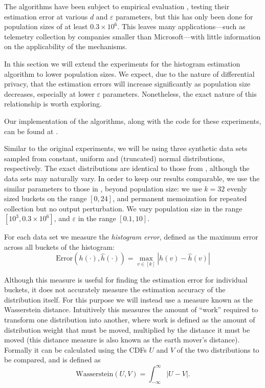 \documentclass[12pt]{article}
\renewcommand{\epsilon}{\varepsilon}
\begin{document}
The algorithms have been subject to empirical evaluation \cite[sec.~5]{microsoft_telemetry}, testing their estimation error at various $d$ and $\epsilon$ parameters, but this has only been done for population sizes of at least $0.3\times 10^6$. This leaves many applications---such as telemetry collection by companies smaller than Microsoft---with little information on the applicability of the mechanisms.

In this section we will extend the experiments for the histogram estimation algorithm to lower population sizes. We expect, due to the nature of differential privacy, that the estimation errors will increase significantly as population size decreases, especially at lower $\epsilon$ parameters. Nonetheless, the exact nature of this relationship is worth exploring. \bigskip

Our implementation of the algorithms, along with the code for these experiments, can be found at \cite{git_repo}.

Similar to the original experiments, we will be using three synthetic data sets sampled from constant, uniform and (truncated) normal distributions, respectively. The exact distributions are identical to those from \cite{microsoft_telemetry}, although the data sets may naturally vary. In order to keep our results comparable, we use the similar parameters to those in \cite{microsoft_telemetry}, beyond population size: we use $k=32$ evenly sized buckets on the range $[0,24]$, and permanent memoization for repeated collection but no output perturbation. We vary population size in the range $[10^3, 0.3 \times 10^6]$, and $\epsilon$ in the range $[0.1, 10]$.

For each data set we measure the \emph{histogram error}, defined as the maximum error across all buckets of the histogram:
\begin{equation*}
    \text{Error}\left(h(\cdot), \hat{h}(\cdot)\right) = \max_{v\in [k]} |h(v) - \hat{h}(v)|
\end{equation*}

Although this measure is useful for finding the estimation error for individual buckets, it does not accurately measure the estimation accuracy of the distribution itself. For this purpose we will instead use a measure known as the Wasserstein distance. Intuitively this measures the amount of ``work'' required to transform one distribution into another, where work is defined as the amount of distribution weight that must be moved, multiplied by the distance it must be moved (this distance measure is also known as the earth mover's distance). Formally it can be calculated using the CDFs $U$ and $V$ of the two distributions to be compared, and is defined as
\begin{equation*}
    \text{Wasserstein}(U,V) = \int_{-\infty}^\infty |U-V|.
\end{equation*}
\end{document}
